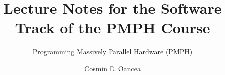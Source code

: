 \documentclass[acmsmall,review]{acmart}\settopmatter{printfolios=true,printccs=false,printacmref=false}
\begin{document}
\title{Lecture Notes for the Software Track of the PMPH Course}

%
%

\subtitle{Programming Massively Parallel Hardware (PMPH)}


\author{Cosmin E. Oancea}

\end{document}
